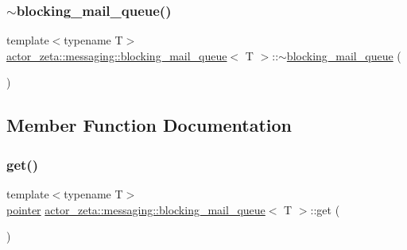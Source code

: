 \subsubsection{\texorpdfstring{$\sim$blocking\+\_\+mail\+\_\+queue()}{~blocking\_mail\_queue()}}
{\footnotesize\ttfamily template$<$typename T$>$ \\
\hyperlink{classactor__zeta_1_1messaging_1_1blocking__mail__queue}{actor\+\_\+zeta\+::messaging\+::blocking\+\_\+mail\+\_\+queue}$<$ T $>$\+::$\sim$\hyperlink{classactor__zeta_1_1messaging_1_1blocking__mail__queue}{blocking\+\_\+mail\+\_\+queue} (\begin{DoxyParamCaption}{ }\end{DoxyParamCaption})\hspace{0.3cm}{\ttfamily [default]}}



\subsection{Member Function Documentation}
\mbox{\label{classactor__zeta_1_1messaging_1_1blocking__mail__queue_ab5d259cfddb68ab54eb7402c61e980b8}} 
\subsubsection{\texorpdfstring{get()}{get()}}
{\footnotesize\ttfamily template$<$typename T$>$ \\
\hyperlink{classactor__zeta_1_1messaging_1_1blocking__mail__queue_a64432628c6a91d330431fc3299021045}{pointer} \hyperlink{classactor__zeta_1_1messaging_1_1blocking__mail__queue}{actor\+\_\+zeta\+::messaging\+::blocking\+\_\+mail\+\_\+queue}$<$ T $>$\+::get (\begin{DoxyParamCaption}{ }\end{DoxyParamCaption})\hspace{0.3cm}{\ttfamily [inline]}}

\mbox{\label{classactor__zeta_1_1messaging_1_1blocking__mail__queue_ad68ddf70deb082f37a154186c75f82bd}} 
